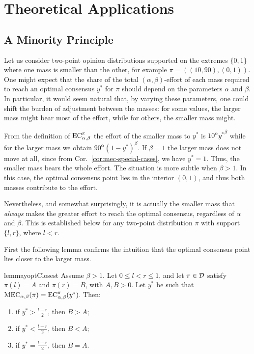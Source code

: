 \section{Theoretical Applications}\label{sec:theoretical-applications}

\subsection{A Minority Principle}
Let us consider two-point opinion distributions 
supported on the extremes $\{0,1\}$ where one mass is smaller than the other, for example 
$\pi=((10,90),(0,1)).$ 
One might expect that the share of the total $(\alpha,\beta)$-effort of each mass required to reach an optimal consensus $y^*$ for $\pi$ should depend on the parameters $\alpha$
and $\beta$. In particular, it would seem natural that, by varying these
parameters, one could shift the burden of adjustment between the masses:
for some values, the larger mass might bear most of the effort, while
for others, the smaller mass might.

From the definition of $\EC$ the effort of the smaller mass to $y^*$ is $10^\alpha {y^*}^\beta$ while for the larger mass we obtain $90^\alpha (1-y^*)^\beta$. If $\beta=1$ the larger mass does not move at all, since from Cor.~\ref{cor:mec-special-cases}, we have $y^* = 1$. Thus, the smaller mass bears the whole effort. The situation is more subtle when $\beta>1$. In this case, the optimal
consensus point lies in the interior $(0,1)$, and thus both masses contribute to the
effort.  

Nevertheless, and somewhat surprisingly, it is actually the smaller mass that \emph{always} makes the greater effort to reach the optimal consensus, regardless of $\alpha$ and $\beta$. This is established below for any two-point distribution \(\pi\) with support \(\{l,r\}\), where \(l<r\).

First the following lemma confirms the intuition that the optimal consensus point lies closer to the larger mass.

\begin{restatable}{lemma}{yoptClosest}\label{lem:yopt-closest-to-largest-general}
Assume \(\beta>1\). Let \(0\le l<r\le 1\), and let \(\pi\in\mathcal{D}\) satisfy \(\pi(l)=A\) and \(\pi(r)=B\), with \(A,B>0\). Let \(y^*\) be such that \(\MEC(\pi)=\EC[\alpha,\beta][\pi](y^*)\). Then:
\begin{enumerate}
\item if \(y^*>\frac{l+r}{2}\), then \(B>A\);
\item if \(y^*<\frac{l+r}{2}\), then \(B<A\);
\item if \(y^*=\frac{l+r}{2}\), then \(B=A\).
\end{enumerate}
\end{restatable}

